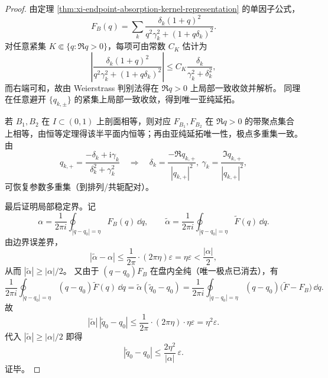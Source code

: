 \begin{proof}
由定理 \ref{thm:xi-endpoint-absorption-kernel-representation} 的单因子公式，
\[
F_B(q)=\sum_k \frac{\delta_k(1+q)^2}{q^2\gamma_k^2+(1+q\delta_k)^2}.
\]
对任意紧集 \(K\Subset\{q:\Re q>0\}\)，每项可由常数 \(C_K\) 估计为
\[
\left|\frac{\delta_k(1+q)^2}{q^2\gamma_k^2+(1+q\delta_k)^2}\right|
\le
C_K\frac{\delta_k}{\gamma_k^2+\delta_k^2},
\]
而右端可和，故由 Weierstrass 判别法得在 \(\Re q>0\) 上局部一致收敛并解析。
同理在任意避开 \(\{q_{k,\pm}\}\) 的紧集上局部一致收敛，得到唯一亚纯延拓。

若 \(B_1,B_2\) 在 \(I\subset(0,1)\) 上剖面相等，则对应 \(F_{B_1},F_{B_2}\) 在 \(\Re q>0\) 的带聚点集合上相等，由恒等定理得该半平面内恒等；再由亚纯延拓唯一性，极点多重集一致。
由
\[
q_{k,+}=\frac{-\delta_k+\mathrm{i}\gamma_k}{\delta_k^2+\gamma_k^2}
\quad\Longrightarrow\quad
\delta_k=\frac{-\Re q_{k,+}}{|q_{k,+}|^2},\ 
\gamma_k=\frac{\Im q_{k,+}}{|q_{k,+}|^2},
\]
可恢复参数多重集（到排列/共轭配对）。

最后证明局部稳定界。记
\[
\alpha=\frac{1}{2\pi i}\oint_{|q-q_0|=\eta}F_B(q)\,\dd q,\qquad
\widetilde\alpha=\frac{1}{2\pi i}\oint_{|q-q_0|=\eta}\widetilde F(q)\,\dd q .
\]
由边界误差界，
\[
|\widetilde\alpha-\alpha|
\le
\frac{1}{2\pi}\cdot(2\pi\eta)\varepsilon
=\eta\varepsilon
<\frac{|\alpha|}{2},
\]
从而 \(|\widetilde\alpha|\ge |\alpha|/2\)。
又由于 \((q-q_0)F_B\) 在盘内全纯（唯一极点已消去），有
\[
\frac{1}{2\pi i}\oint_{|q-q_0|=\eta}(q-q_0)\widetilde F(q)\,\dd q
=
\widetilde\alpha(\widetilde q_0-q_0)
=
\frac{1}{2\pi i}\oint_{|q-q_0|=\eta}(q-q_0)\bigl(\widetilde F-F_B\bigr)\,\dd q.
\]
故
\[
|\widetilde\alpha|\,|\widetilde q_0-q_0|
\le
\frac{1}{2\pi}\cdot(2\pi\eta)\cdot\eta\varepsilon
=\eta^2\varepsilon.
\]
代入 \(|\widetilde\alpha|\ge |\alpha|/2\) 即得
\[
|\widetilde q_0-q_0|
\le
\frac{2\eta^2}{|\alpha|}\,\varepsilon.
\]
证毕。
\end{proof}

\endinput
